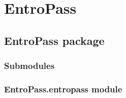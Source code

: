 \documentclass[letterpaper,10pt,english]{sphinxmanual}
\begin{document}
\chapter{EntroPass}
\label{\detokenize{modules:entropass}}\label{\detokenize{modules::doc}}

\section{EntroPass package}
\label{\detokenize{EntroPass:entropass-package}}\label{\detokenize{EntroPass::doc}}

\subsection{Submodules}
\label{\detokenize{EntroPass:submodules}}

\subsection{EntroPass.entropass module}
\label{\detokenize{EntroPass:module-EntroPass.entropass}}\label{\detokenize{EntroPass:entropass-entropass-module}}
\end{document}
